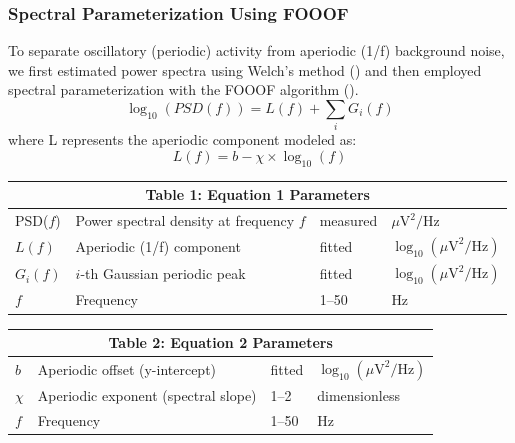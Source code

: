 \documentclass[11pt,a4paper]{article}
\begin{document}
\subsubsection{Spectral Parameterization Using FOOOF}
To separate oscillatory (periodic) activity from aperiodic (1/f) background noise, we first estimated power spectra using Welch’s method (\cite{welch1967psd}) and then employed spectral parameterization with the FOOOF algorithm (\cite{haller2018fooof}).
\begin{displaymath}
\log_{10}(PSD(f)) = L(f) + \sum_{i} G_{i}(f)
\end{displaymath}
where L represents the aperiodic component modeled as:
\begin{displaymath}
L(f) = b - \chi \times \log_{10}(f)
\end{displaymath}
\begin{table}[h]
    \centering
     \begin{tabular}{llll}
        \toprule
        \multicolumn{4}{c}{\textbf{Table 1: Equation 1 Parameters}} \\
        \midrule
        PSD($f$)& Power spectral density at frequency $f$ & measured & $\mu\mathrm{V}^2/\mathrm{Hz}$ \\
        $L(f)$ & Aperiodic (1/f) component & fitted & $\log_{10}(\mu\mathrm{V}^2/\mathrm{Hz})$ \\
        $G_i(f)$ & $i$-th Gaussian periodic peak & fitted & $\log_{10}(\mu\mathrm{V}^2/\mathrm{Hz})$ \\
        $f$ & Frequency & 1--50 & Hz \\
        \bottomrule
    \end{tabular}
\end{table}
\begin{table}[h]
    \centering
    \begin{tabular}{llll}
        \toprule
        \multicolumn{4}{c}{\textbf{Table 2: Equation 2 Parameters}} \\
        \midrule
        $b$ & Aperiodic offset (y-intercept) & fitted & $\log_{10}(\mu\mathrm{V}^2/\mathrm{Hz})$ \\
        $\chi$ & Aperiodic exponent (spectral slope) & 1--2 & dimensionless \\
        $f$ & Frequency & 1--50 & Hz \\
        \bottomrule
    \end{tabular}
\end{table}
\end{document}

